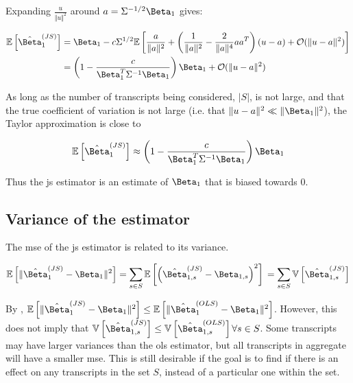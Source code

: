 Expanding $\frac{u}{\Vert u \Vert ^2}$ around $a = \Sigma^{-1/2}\Beta_1$ gives:

\begin{align*}
  \mathbb{E}\left[ \hat{\Beta}_1^{(JS)} \right]
  &= \Beta_1 - c\Sigma^{1/2}\mathbb{E} \left[ \frac{a}{\Vert a \Vert ^2} + \left( \frac{1}{\Vert a \Vert ^2}
    - \frac{2}{\Vert a \Vert ^4} aa^T\right)(u - a) + \mathcal{O}(\Vert u - a \Vert ^2)\right] \\
  & = \left(1 - \frac{c}{\Beta_1^T \Sigma^{-1} \Beta_1} \right) \Beta_1
    + \mathcal{O}(\Vert u - a \Vert ^2)
\end{align*}

As long as the number of transcripts being considered, $|S|$, is not large, and that the true coefficient of variation is not large (i.e. that $\Vert u - a \Vert ^2 \ll \Vert \Beta_1 \Vert ^2$), the Taylor approximation is close to

\begin{equation}
  \mathbb{E}\left[ \hat{\Beta}_1^{(JS)} \right] \approx \left(1 - \frac{c}{\Beta_1^T \Sigma^{-1} \Beta_1} \right) \Beta_1
\end{equation}

Thus the \gls{js} estimator is an estimate of $\Beta_1$ that is biased towards 0.

\subsection{Variance of the  estimator}

The \gls{mse} of the \gls{js} estimator is related to its variance.

\begin{equation*}
  \mathbb{E} \left[ \Vert \hat{\Beta}_1^{(JS)} - \Beta_1 \Vert ^2\right] 
  = \sum_{s \in S} \mathbb{E}\left[ \left( \hat{\Beta}_{1,s}^{(JS)} - \Beta_{1,s} \right)^2 \right] \\
  = \sum_{s \in S} \mathbb{V}\left[ \hat{\Beta}_{1,s}^{(JS)} \right]
\end{equation*}

By \cite[REF][]{bockMinimaxEstimatorsMean1975}, $\mathbb{E} \left[ \Vert \hat{\Beta}_1^{(JS)} - \Beta_1 \Vert ^2\right] \le \mathbb{E} \left[ \Vert \hat{\Beta}_1^{(OLS)} - \Beta_1 \Vert ^2\right]$.
However, this does not imply that $\mathbb{V} \left[ \hat{\Beta}_{1,s}^{(JS)} \right] \le \mathbb{V} \left[ \hat{\Beta}_{1,s}^{(OLS)} \right] \forall s \in S$.
Some transcripts may have larger variances than the \gls{ols} estimator, but all transcripts in aggregate will have a smaller \gls{mse}.
This is still desirable if the goal is to find if there is an effect on any transcripts in the set $S$, instead of a particular one within the set.

